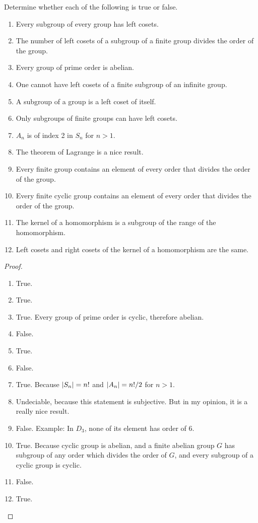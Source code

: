 \newpage
\begin{exercise}
    Determine whether each of the following is true or false.
    \begin{enumerate}[label={\textbf{\alph*.}}]
        \item Every subgroup of every group has left cosets.
        \item The number of left cosets of a subgroup of a finite group divides the order of the group.
        \item Every group of prime order is abelian.
        \item One cannot have left cosets of a finite subgroup of an infinite group.
        \item A subgroup of a group is a left coset of itself.
        \item Only subgroups of finite groups can have left cosets.
        \item $A_{n}$ is of index 2 in $S_{n}$ for $n > 1$.
        \item The theorem of Lagrange is a nice result.
        \item Every finite group contains an element of every order that divides the order of the group.
        \item Every finite cyclic group contains an element of every order that divides the order of the group.
        \item The kernel of a homomorphism is a subgroup of the range of the homomorphism.
        \item Left cosets and right cosets of the kernel of a homomorphism are the same.
    \end{enumerate}
\end{exercise}

\begin{proof}
    \begin{enumerate}[label={\textbf{\alph*.}}]
        \item True.
        \item True.
        \item True. Every group of prime order is cyclic, therefore abelian.
        \item False.
        \item True.
        \item False.
        \item True. Because $\left\vert{S_{n}}\right\vert = n!{}$ and $\left\vert{A_{n}}\right\vert = n!/2$ for $n > 1$.
        \item Undeciable, because this statement is subjective. But in my opinion, it is a really nice result.
        \item False. Example: In $D_{3}$, none of its element has order of 6.
        \item True. Because cyclic group is abelian, and a finite abelian group $G$ has subgroup of any order which divides the order of $G$, and every subgroup of a cyclic group is cyclic.
        \item False.
        \item True.
    \end{enumerate}
\end{proof}

